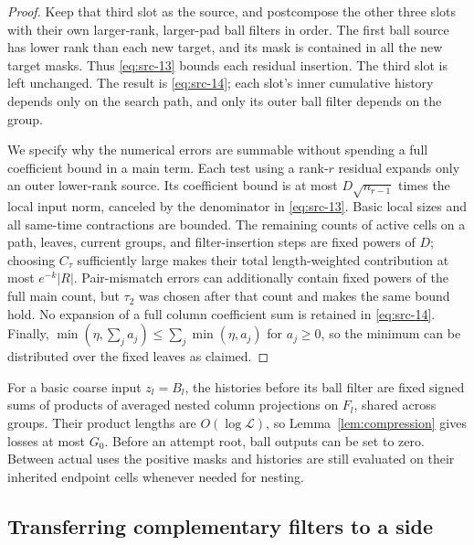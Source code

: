 \begin{proof}
Keep that third slot as the source, and postcompose the other three
slots with their own larger-rank, larger-pad ball filters in order.
The first ball source has lower rank than each new target, and its
mask is contained in all the new target masks.  Thus
\eqref{eq:src-13} bounds each residual insertion.  The third slot is
left unchanged.  The result is \eqref{eq:src-14}; each slot's inner
cumulative history depends only on the search path, and only its outer
ball filter depends on the group.

We specify why the numerical errors are summable without spending a
full coefficient bound in a main term.  Each test using a rank-$r$
residual expands only an outer lower-rank source.  Its coefficient
bound is at most $D\sqrt{n_{r-1}}$ times the local input norm, canceled
by the denominator in \eqref{eq:src-13}.  Basic local sizes and all
same-time contractions are bounded.  The remaining counts of active
cells on a path, leaves, current groups, and filter-insertion steps are fixed
powers of $D$; choosing $C_\tau$ sufficiently large makes their total
length-weighted contribution at most $e^{-k}|R|$.  Pair-mismatch
errors can additionally contain fixed powers of the full main count,
but $\tau_2$ was chosen after that count and makes the same bound hold.
No expansion of a full column coefficient sum is retained in
\eqref{eq:src-14}.  Finally,
$\min(\eta,\sum_j a_j)\le\sum_j\min(\eta,a_j)$ for $a_j\ge0$,
so the minimum can be distributed over the fixed leaves as claimed.
\end{proof}

For a basic coarse input $z_l=B_l$, the histories before its ball filter
are fixed signed sums of products of averaged nested column projections
on $F_l$, shared across groups.  Their product lengths are
$O(\log\mathcal L)$, so Lemma~\ref{lem:compression} gives losses at most
$G_0$.  Before an attempt root, ball outputs can be set to zero.
Between actual uses the positive masks and histories are still evaluated
on their inherited endpoint cells whenever needed for nesting.

\subsection{Transferring complementary filters to a side}

